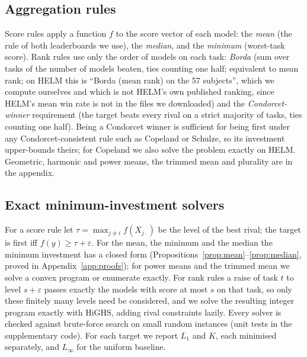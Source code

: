 \documentclass{article}
\begin{document}
\subsection{Aggregation rules}
\label{sec:rules}
Score rules apply a function $f$ to the score vector of each model: the \emph{mean} (the rule of both leaderboards we use), the \emph{median}, and the \emph{minimum} (worst-task score). Rank rules use only the order of models on each task: \emph{Borda} (sum over tasks of the number of models beaten, ties counting one half; equivalent to mean rank; on HELM this is ``Borda (mean rank) on the 57 subjects'', which we compute ourselves and which is not HELM's own published ranking, since HELM's mean win rate is not in the files we downloaded) and the \emph{Condorcet-winner} requirement (the target beats every rival on a strict majority of tasks, ties counting one half). Being a Condorcet winner is sufficient for being first under any Condorcet-consistent rule such as Copeland or Schulze, so its investment upper-bounds theirs; for Copeland we also solve the problem exactly on HELM. Geometric, harmonic and power means, the trimmed mean and plurality are in the appendix.

\subsection{Exact minimum-investment solvers}
\label{sec:solvers}
For a score rule let $\tau=\max_{j\neq i} f(X_{j\cdot})$ be the level of the best rival; the target is first iff $f(y)\ge \tau+\varepsilon$. For the mean, the minimum and the median the minimum investment has a closed form (Propositions~\ref{prop:mean}--\ref{prop:median}, proved in Appendix~\ref{app:proofs}); for power means and the trimmed mean we solve a convex program or enumerate exactly. For rank rules a raise of task $t$ to level $s+\varepsilon$ passes exactly the models with score at most $s$ on that task, so only these finitely many levels need be considered, and we solve the resulting integer program exactly with HiGHS, adding rival constraints lazily. Every solver is checked against brute-force search on small random instances (unit tests in the supplementary code). For each target we report $L_1$ and $K$, each minimised separately, and $L_\infty$ for the uniform baseline.
\end{document}
